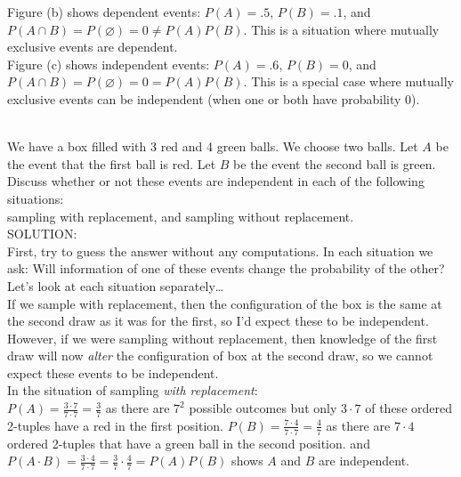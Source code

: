 \documentclass[12pt]{article}
\begin{document}
\noindent Figure (b) shows dependent events: $P(A)=.5$, $P(B)=.1$, and $P(A\cap B)=P(\varnothing)=0\ne P(A)P(B)$.  This is a situation where mutually exclusive events are dependent.\\

\noindent Figure (c) shows independent events: $P(A)=.6$, $P(B)=0$, and $P(A\cap B) = P(\varnothing)=0=P(A)P(B)$.  This is a special case where mutually exclusive events can be
independent (when one or both have probability 0).



\newpage



\\
\noindent We have a box filled with 3 red and 4 green balls. We choose two balls.
Let $A$ be the event that the first ball is red. Let $B$
be the event the second ball is green.  Discuss whether or not these events are independent in each of the following situations:\\
sampling with replacement, and sampling without replacement.\\

\noindent SOLUTION:\\
\noindent First, try to guess the answer without any computations.  In each situation we ask: Will information of one of these events change the probability of the other?
Let's look at each situation separately\dots\\

\noindent If we sample with replacement, then the configuration of the box is the same at the second draw as it was for the first, so I'd expect these to be independent.
However, if we were sampling without replacement, then knowledge of the first draw will now {\em alter} the configuration of box at the second draw, so we cannot
expect these events to be independent.\\

\noindent In the situation of sampling {\em with replacement}:\\
\noindent $P(A)=\frac {3\cdot 7}{7\cdot 7}=\frac 37$ as there are $7^2$ possible outcomes but only $3\cdot 7$ of these ordered 2-tuples have a red in the first position.
$P(B)=\frac {7\cdot 4}{7\cdot 7}=\frac 47$ as there are $7\cdot 4$ ordered 2-tuples that have a green ball in the second position.
and
$P(A\cdot B) = \frac {3\cdot 4}{7\cdot 7} = \frac 37\cdot \frac 47 = P(A)P(B)$ shows $A$ and $B$ are independent.\\
\end{document}
